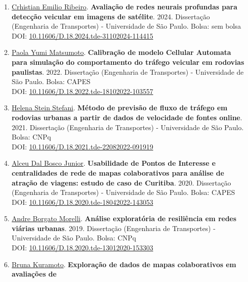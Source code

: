 \documentclass[
  brazilian,
  11pt,
  a4paper,
]{article}
\begin{document}
\begin{enumerate}
\def\labelenumi{\arabic{enumi}.}
\item
  \href{}{Crhistian Emilio Ribeiro}. \textbf{Avaliação de redes neurais
  profundas para detecção veicular em imagens de satélite}. 2024.
  Dissertação (Engenharia de Transportes) - Universidade de São Paulo.
  Bolsa: sem bolsa\\
  DOI:
  \href{https://doi.org/10.11606/D.18.2024.tde-31102024-114415}{10.11606/D.18.2024.tde-31102024-114415}
\item
  \href{https://lattes.cnpq.br/6933325479741942}{Paola Yumi Matsumoto}.
  \textbf{Calibração de modelo Cellular Automata para simulação do
  comportamento do tráfego veicular em rodovias paulistas}. 2022.
  Dissertação (Engenharia de Transportes) - Universidade de São Paulo.
  Bolsa: CAPES\\
  DOI:
  \href{https://doi.org/10.11606/D.18.2022.tde-18102022-103557}{10.11606/D.18.2022.tde-18102022-103557}
\item
  \href{https://lattes.cnpq.br/2263620972100266}{Helena Stein Stefani}.
  \textbf{Método de previsão de fluxo de tráfego em rodovias urbanas a
  partir de dados de velocidade de fontes online}. 2021. Dissertação
  (Engenharia de Transportes) - Universidade de São Paulo. Bolsa: CNPq\\
  DOI:
  \href{https://doi.org/10.11606/D.18.2021.tde-22082022-091919}{10.11606/D.18.2021.tde-22082022-091919}
\item
  \href{https://lattes.cnpq.br/7512695029586698}{Alceu Dal Bosco
  Junior}. \textbf{Usabilidade de Pontos de Interesse e centralidades de
  rede de mapas colaborativos para análise de atração de viagens: estudo
  de caso de Curitiba}. 2020. Dissertação (Engenharia de Transportes) -
  Universidade de São Paulo. Bolsa: CAPES\\
  DOI:
  \href{https://doi.org/10.11606/D.18.2020.tde-18042022-143053}{10.11606/D.18.2020.tde-18042022-143053}
\item
  \href{https://lattes.cnpq.br/5248357327146113}{Andre Borgato Morelli}.
  \textbf{Análise exploratória de resiliência em redes viárias urbanas}.
  2019. Dissertação (Engenharia de Transportes) - Universidade de São
  Paulo. Bolsa: CNPq\\
  DOI:
  \href{https://doi.org/10.11606/D.18.2020.tde-13012020-153303}{10.11606/D.18.2020.tde-13012020-153303}
\item
  \href{https://lattes.cnpq.br/3302815314452867}{Bruna Kuramoto}.
  \textbf{Exploração de dados de mapas colaborativos em avaliações de
}
\end{enumerate}
\end{document}
